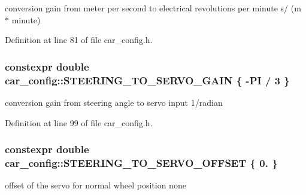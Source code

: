 conversion gain from meter per second to electrical revolutions per minute  s/ (m $\ast$ minute) 



Definition at line 81 of file car\+\_\+config.\+h.

\subsubsection[{\texorpdfstring{S\+T\+E\+E\+R\+I\+N\+G\+\_\+\+T\+O\+\_\+\+S\+E\+R\+V\+O\+\_\+\+G\+A\+IN}{STEERING_TO_SERVO_GAIN}}]{\setlength{\rightskip}{0pt plus 5cm}constexpr double car\+\_\+config\+::\+S\+T\+E\+E\+R\+I\+N\+G\+\_\+\+T\+O\+\_\+\+S\+E\+R\+V\+O\+\_\+\+G\+A\+IN \{ -\/{\bf PI} / 3 \}}\hypertarget{namespacecar__config_aa8ab85fe7b8ab728f34d15028f114d86}{}\label{namespacecar__config_aa8ab85fe7b8ab728f34d15028f114d86}


conversion gain from steering angle to servo input  1/radian 



Definition at line 99 of file car\+\_\+config.\+h.

\subsubsection[{\texorpdfstring{S\+T\+E\+E\+R\+I\+N\+G\+\_\+\+T\+O\+\_\+\+S\+E\+R\+V\+O\+\_\+\+O\+F\+F\+S\+ET}{STEERING_TO_SERVO_OFFSET}}]{\setlength{\rightskip}{0pt plus 5cm}constexpr double car\+\_\+config\+::\+S\+T\+E\+E\+R\+I\+N\+G\+\_\+\+T\+O\+\_\+\+S\+E\+R\+V\+O\+\_\+\+O\+F\+F\+S\+ET \{ 0. \}}\hypertarget{namespacecar__config_abb6ef746663276219b321683dfbb8896}{}\label{namespacecar__config_abb6ef746663276219b321683dfbb8896}


offset of the servo for normal wheel position  none 



